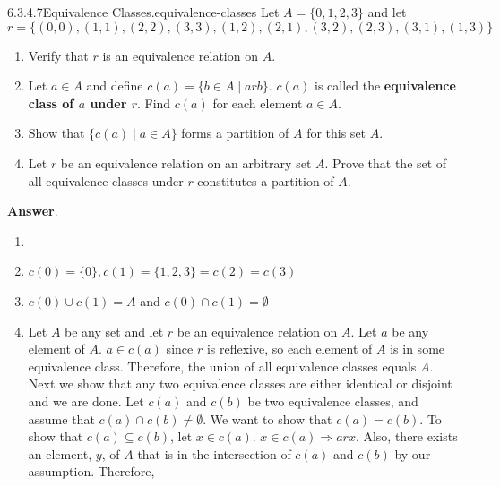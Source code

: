 \documentclass[twoside,10pt,]{book}
\newcommand{\terminology}[1]{\textbf{#1}}
\numberwithin{equation}{section}
\begin{document}
\begin{divisionsolution}{6.3.4.7}{Equivalence Classes.}{equivalence-classes}%
\hypertarget{p-2081}{}%
Let \(A = \{0, 1, 2, 3\}\) and let%
\begin{equation*}
r = \{(0, 0), (1, 1), (2, 2), (3, 3), (1, 2),(2, 1), (3, 2), (2, 3), (3, 1), (1, 3)\}
\end{equation*}
\leavevmode%
\begin{enumerate}[label=(\alph*)]
\item\hypertarget{li-1098}{}\hypertarget{p-2082}{}%
Verify that \(r\) is an equivalence relation on \(A\).%
\item\hypertarget{li-1099}{}\hypertarget{p-2083}{}%
Let \(a \in A\) and define \(c(a) = \{b \in A \mid a rb\}\). \label{notation-37} \(c(a)\) is called the \terminology{equivalence class of \(a\) under \(r\)}. Find \(c(a)\) for each element \(a \in A\).%
\item\hypertarget{li-1100}{}\hypertarget{p-2084}{}%
Show that \(\{c(a) \mid  a \in A\}\) forms a partition of \(A\) for this set \(A\).%
\item\hypertarget{li-1101}{}\hypertarget{p-2085}{}%
Let \(r\) be an equivalence relation on an arbitrary set \(A\). Prove that the set of all equivalence classes under \(r\) constitutes a partition of \(A\).%
\end{enumerate}
%
\par\smallskip%
\noindent\textbf{Answer}.\quad%
\hypertarget{p-2086}{}%
\leavevmode%
\begin{enumerate}[label=(\alph*)]
\item\hypertarget{li-1102}{}%
\item\hypertarget{li-1103}{}\hypertarget{p-2087}{}%
\(c(0)=\{0\}, c(1)=\{1,2,3\}=c(2)=c(3)\)%
\item\hypertarget{li-1104}{}\hypertarget{p-2088}{}%
\(c(0)\cup c(1)=A\) and \(c(0)\cap c(1)=\emptyset\)%
\item\hypertarget{li-1105}{}\hypertarget{p-2089}{}%
Let \(A\) be any set and let \(r\) be an equivalence relation on \(A\). Let \(a\) be any element of \(A\). \(a\in c(a)\) since \(r\) is reflexive, so each element of \(A\) is in some equivalence class. Therefore, the union of all equivalence classes equals \(A\). Next we show that any two equivalence classes are either identical or disjoint and we are done. Let \(c(a)\) and \(c(b)\) be two equivalence classes, and assume that \(c(a)\cap c(b)\neq \emptyset\). We want to show that \(c(a)=c(b)\). To show that \(c(a)\subseteq c(b)\), let \(x\in c(a)\). \(x\in c(a) \Rightarrow a r x \). Also, there exists an element, \(y\), of \(A\) that is in the intersection of \(c(a)\) and \(c(b)\) by our assumption. Therefore,%

\end{enumerate}
\end{divisionsolution}
\end{document}
